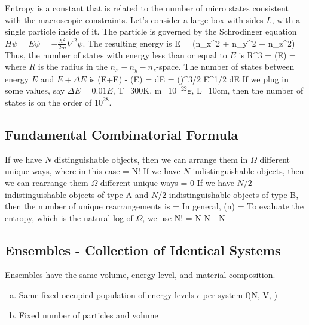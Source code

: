 \documentclass[12pt]{article}
\begin{document}
Entropy is a constant that is related to the number of micro states consistent with the macroscopic constraints.
\eqs
{}
\eqe
Let's consider a large box with sides $L$, with a single particle inside of it.  The particle is governed by the Schrodinger equation $H \psi = E \psi = -\frac{\hbar^2}{2m}\nabla^2\psi$.  The resulting energy is
\eqs
E = (n_x^2 + n_y^2 + n_z^2)
\eqe
Thus, the number of states with energy less than or equal to $E$ is
\eqs
{}R^3 = \Phi(E) = 
\eqe
where $R$ is the radius in the $n_x-n_y-n_z$-space.  The number of states between energy $E$ and $E+\Delta E$ is
\eqs
\Phi(E+\Delta E) - \Phi(E) = dE =  \Big(\Big)^{3/2} E^{1/2} dE
\eqe
If we plug in some values, say $\Delta E = 0.01 E$, T=300K, m=10$^{-22}$g, L=10cm, then the number of states is on the order of $10^{28}$.

\subsection{Fundamental Combinatorial Formula}
If we have $N$ distinguishable objects, then we can arrange them in $\Omega$ different unique ways, where in this case
\eqs
\Omega = N!
\eqe
If we have $N$ indistinguishable objects, then we can rearrange them $\Omega$ different unique ways
\eqs
\Omega = 0
\eqe
If we have $N/2$ indistinguishable objects of type A and $N/2$ indistinguishable objects of type B, then the number of unique rearrangements is
\eqs
\Omega = 
\eqe
In general,
\eqs
\Omega(n) = 
\eqe
To evaluate the entropy, which is the natural log of $\Omega$, we use 
\eqs
\ln N! = N \ln N - N
\eqe

\subsection{Ensembles - Collection of Identical Systems}
Ensembles have the same volume, energy level, and material composition.\\

\begin{enumerate}[(a)]
\item Same fixed occupied population of energy levels $\epsilon$ per system
\eqs
f(N, V, \epsilon)
\eqe
\item Fixed number of particles and volume
\end{enumerate}
\end{document}

